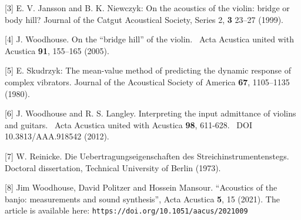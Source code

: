   [3] E. V. Jansson and B. K. Niewczyk: On the acoustics of the violin: bridge 
  or body hill? Journal of the Catgut Acoustical Society, Series 2, \textbf{3 } 
  23–27 (1999). 

  [4] J. Woodhouse. On the ``bridge hill'' of the violin.~ Acta Acustica united 
  with Acustica \textbf{91}, 155–165 (2005). 

  [5] E. Skudrzyk: The mean-value method of predicting the dynamic response of 
  complex vibrators. Journal of the Acoustical Society of America \textbf{67}, 
  1105–1135 (1980). 

  [6] J. Woodhouse and R. S. Langley. Interpreting the input admittance of 
  violins and guitars.~ Acta Acustica united with Acustica \textbf{98}, 
  611-628.~ DOI 10.3813/AAA.918542 (2012). 

  [7] W. Reinicke. Die Uebertragungseigenschaften des Streichinstrumentenstegs. 
  Doctoral dissertation, Technical University of Berlin (1973). 

  [8] Jim Woodhouse, David Politzer and Hossein Mansour. ``Acoustics of the 
  banjo: measurements and sound synthesis'', Acta Acustica \textbf{5}, 15 
  (2021). The article is available here: 
  \tt{}https://doi.org/10.1051/aacus/2021009\rm{} 